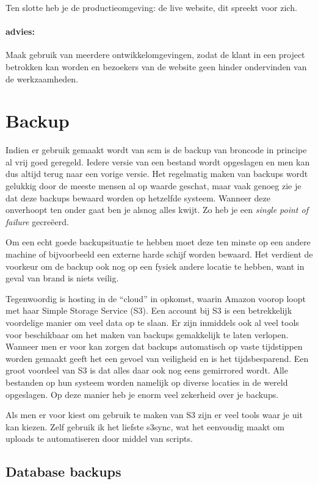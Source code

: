 Ten slotte heb je de productieomgeving: de live website, dit spreekt voor zich.

\paragraph{advies:} Maak gebruik van meerdere ontwikkelomgevingen, zodat de klant in een project betrokken kan worden en bezoekers van de website geen hinder ondervinden van de werkzaamheden.

\section{Backup}

Indien er gebruik gemaakt wordt van {\sc scm} is de backup van broncode in principe al vrij goed geregeld. Iedere versie van een bestand wordt opgeslagen en men kan dus altijd terug naar een vorige versie. Het regelmatig maken van backups wordt gelukkig door de meeste mensen al op waarde geschat, maar vaak genoeg zie je dat deze backups bewaard worden op hetzelfde systeem. Wanneer deze onverhoopt ten onder gaat ben je alsnog alles kwijt. Zo heb je een  \emph{single point of failure} gecreëerd.

Om een echt goede backupsituatie te hebben moet deze ten minste op een andere machine of bijvoorbeeld een externe harde schijf worden bewaard. Het verdient de voorkeur om de backup ook nog op een fysiek andere locatie te hebben, want in geval van brand is niets veilig.

Tegenwoordig is hosting in de ``cloud'' in opkomst, waarin Amazon voorop loopt met haar Simple Storage Service (S3). Een account bij S3 is een betrekkelijk voordelige manier om veel data op te slaan. Er zijn inmiddels ook al veel tools voor beschikbaar om het maken van backups gemakkelijk te laten verlopen. Wanneer men er voor kan zorgen dat backups automatisch op vaste tijdstippen worden gemaakt geeft het een gevoel van veiligheid en is het tijdsbesparend. Een groot voordeel van S3 is dat alles daar ook nog eens gemirrored wordt. Alle bestanden op hun systeem worden namelijk op diverse locaties in de wereld opgeslagen. Op deze manier heb je enorm veel zekerheid over je backups.

Als men er voor kiest om gebruik te maken van S3 zijn er veel tools waar je uit kan kiezen.\cite{amazontools} Zelf gebruik ik het liefste s3sync\cite{s3sync}, wat het eenvoudig maakt om uploads te automatiseren door middel van scripts.

\subsection{Database backups}

